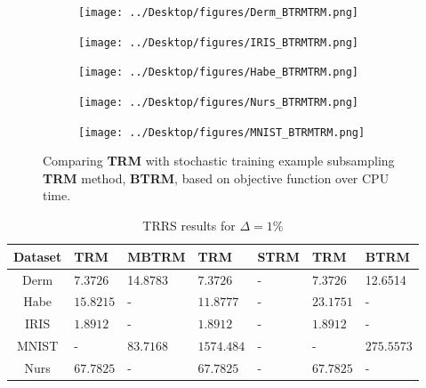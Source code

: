 \documentclass[letterpaper,12pt,titlepage,oneside,final]{book}
\begin{document}
	\begin{figure}
		\centering
		\begin{subfigure}{.45\textwidth}
			\texttt{[image: ../Desktop/figures/Derm\_BTRMTRM.png]}
		\end{subfigure}%
		\begin{subfigure}{.45\textwidth}
			\texttt{[image: ../Desktop/figures/IRIS\_BTRMTRM.png]}
		\end{subfigure}
		\begin{subfigure}{.45\textwidth}
			\texttt{[image: ../Desktop/figures/Habe\_BTRMTRM.png]}
		\end{subfigure}
		\begin{subfigure}{.45\textwidth}
			\texttt{[image: ../Desktop/figures/Nurs\_BTRMTRM.png]}
		\end{subfigure}
		\begin{subfigure}{.45\textwidth}
			\texttt{[image: ../Desktop/figures/MNIST\_BTRMTRM.png]}
		\end{subfigure}
		\caption{Comparing \textbf{TRM} with stochastic training example subsampling \textbf{TRM} method, \textbf{BTRM}, based on objective function over CPU time.}
		\label{figure:BTRMTRM}
	\end{figure}
	
	\begin{table}[h] 
		\centering 
		\begin{tabular}{ |c||l|l||l|l||l|l| } 
			\hline 
			\textbf{Dataset} & \textbf{TRM} & \textbf{MBTRM} & \textbf{TRM} & \textbf{STRM} & \textbf{TRM} & \textbf{BTRM} \\ 
			\hline 
			\hline 
			Derm & $\mathbf{7.3726}$ &14.8783 & $\mathbf{7.3726}$ & - & $\mathbf{7.3726}$ &12.6514\\ 
			\hline 
			Habe & $\mathbf{15.8215}$ & - & $\mathbf{11.8777}$ & - & $\mathbf{23.1751}$ & -\\ 
			\hline 
			IRIS & $\mathbf{1.8912}$ & - & $\mathbf{1.8912}$ & - & $\mathbf{1.8912}$ & -\\ 
			\hline 
			MNIST & - & $\mathbf{83.7168}$ & $\mathbf{1574.484}$ & - & - & $\mathbf{275.5573}$\\ 
			\hline 
			Nurs & $\mathbf{67.7825}$ & - & $\mathbf{67.7825}$ & - & $\mathbf{67.7825}$ & -\\ 
			\hline 
		\end{tabular} 
		\caption{TRRS results for $\Delta = 1\%$} \label{SMBTRMTRM1} \end{table}
	
\end{document}
